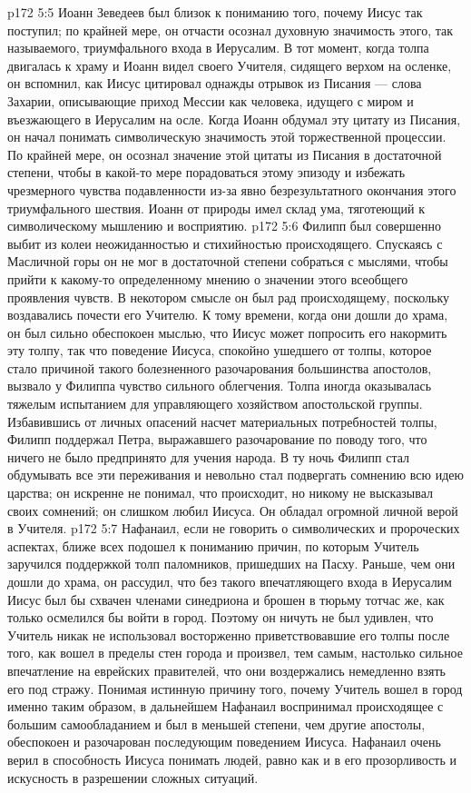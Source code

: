 \vs p172 5:5 Иоанн Зеведеев был близок к пониманию того, почему Иисус так поступил; по крайней мере, он отчасти осознал духовную значимость этого, так называемого, триумфального входа в Иерусалим. В тот момент, когда толпа двигалась к храму и Иоанн видел своего Учителя, сидящего верхом на осленке, он вспомнил, как Иисус цитировал однажды отрывок из Писания --- слова Захарии, описывающие приход Мессии как человека, идущего с миром и въезжающего в Иерусалим на осле. Когда Иоанн обдумал эту цитату из Писания, он начал понимать символическую значимость этой торжественной процессии. По крайней мере, он осознал значение этой цитаты из Писания в достаточной степени, чтобы в какой\hyp{}то мере порадоваться этому эпизоду и избежать чрезмерного чувства подавленности из\hyp{}за явно безрезультатного окончания этого триумфального шествия. Иоанн от природы имел склад ума, тяготеющий к символическому мышлению и восприятию.
\vs p172 5:6 \pc Филипп был совершенно выбит из колеи неожиданностью и стихийностью происходящего. Спускаясь с Масличной горы он не мог в достаточной степени собраться с мыслями, чтобы прийти к какому\hyp{}то определенному мнению о значении этого всеобщего проявления чувств. В некотором смысле он был рад происходящему, поскольку воздавались почести его Учителю. К тому времени, когда они дошли до храма, он был сильно обеспокоен мыслью, что Иисус может попросить его накормить эту толпу, так что поведение Иисуса, спокойно ушедшего от толпы, которое стало причиной такого болезненного разочарования большинства апостолов, вызвало у Филиппа чувство сильного облегчения. Толпа иногда оказывалась тяжелым испытанием для управляющего хозяйством апостольской группы. Избавившись от личных опасений насчет материальных потребностей толпы, Филипп поддержал Петра, выражавшего разочарование по поводу того, что ничего не было предпринято для учения народа. В ту ночь Филипп стал обдумывать все эти переживания и невольно стал подвергать сомнению всю идею царства; он искренне не понимал, что происходит, но никому не высказывал своих сомнений; он слишком любил Иисуса. Он обладал огромной личной верой в Учителя.
\vs p172 5:7 \pc Нафанаил, если не говорить о символических и пророческих аспектах, ближе всех подошел к пониманию причин, по которым Учитель заручился поддержкой толп паломников, пришедших на Пасху. Раньше, чем они дошли до храма, он рассудил, что без такого впечатляющего входа в Иерусалим Иисус был бы схвачен членами синедриона и брошен в тюрьму тотчас же, как только осмелился бы войти в город. Поэтому он ничуть не был удивлен, что Учитель никак не использовал восторженно приветствовавшие его толпы после того, как вошел в пределы стен города и произвел, тем самым, настолько сильное впечатление на еврейских правителей, что они воздержались немедленно взять его под стражу. Понимая истинную причину того, почему Учитель вошел в город именно таким образом, в дальнейшем Нафанаил воспринимал происходящее с большим самообладанием и был в меньшей степени, чем другие апостолы, обеспокоен и разочарован последующим поведением Иисуса. Нафанаил очень верил в способность Иисуса понимать людей, равно как и в его прозорливость и искусность в разрешении сложных ситуаций.
